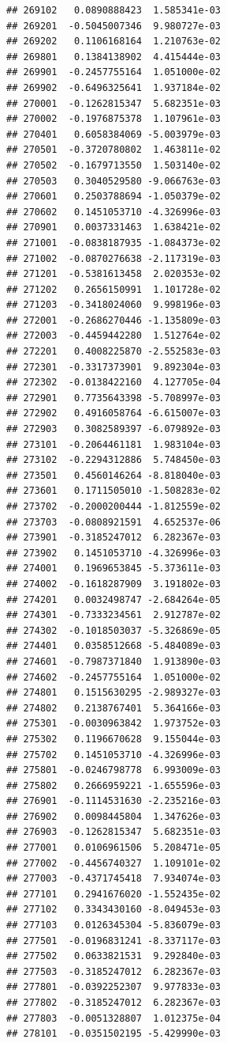 \documentclass[ignorenonframetext,]{beamer}
\begin{document}
\begin{frame}[fragile]
\begin{verbatim}
## 269102   0.0890888423  1.585341e-03
## 269201  -0.5045007346  9.980727e-03
## 269202   0.1106168164  1.210763e-02
## 269801   0.1384138902  4.415444e-03
## 269901  -0.2457755164  1.051000e-02
## 269902  -0.6496325641  1.937184e-02
## 270001  -0.1262815347  5.682351e-03
## 270002  -0.1976875378  1.107961e-03
## 270401   0.6058384069 -5.003979e-03
## 270501  -0.3720780802  1.463811e-02
## 270502  -0.1679713550  1.503140e-02
## 270503   0.3040529580 -9.066763e-03
## 270601   0.2503788694 -1.050379e-02
## 270602   0.1451053710 -4.326996e-03
## 270901   0.0037331463  1.638421e-02
## 271001  -0.0838187935 -1.084373e-02
## 271002  -0.0870276638 -2.117319e-03
## 271201  -0.5381613458  2.020353e-02
## 271202   0.2656150991  1.101728e-02
## 271203  -0.3418024060  9.998196e-03
## 272001  -0.2686270446 -1.135809e-03
## 272003  -0.4459442280  1.512764e-02
## 272201   0.4008225870 -2.552583e-03
## 272301  -0.3317373901  9.892304e-03
## 272302  -0.0138422160  4.127705e-04
## 272901   0.7735643398 -5.708997e-03
## 272902   0.4916058764 -6.615007e-03
## 272903   0.3082589397 -6.079892e-03
## 273101  -0.2064461181  1.983104e-03
## 273102  -0.2294312886  5.748450e-03
## 273501   0.4560146264 -8.818040e-03
## 273601   0.1711505010 -1.508283e-02
## 273702  -0.2000200444 -1.812559e-02
## 273703  -0.0808921591  4.652537e-06
## 273901  -0.3185247012  6.282367e-03
## 273902   0.1451053710 -4.326996e-03
## 274001   0.1969653845 -5.373611e-03
## 274002  -0.1618287909  3.191802e-03
## 274201   0.0032498747 -2.684264e-05
## 274301  -0.7333234561  2.912787e-02
## 274302  -0.1018503037 -5.326869e-05
## 274401   0.0358512668 -5.484089e-03
## 274601  -0.7987371840  1.913890e-03
## 274602  -0.2457755164  1.051000e-02
## 274801   0.1515630295 -2.989327e-03
## 274802   0.2138767401  5.364166e-03
## 275301  -0.0030963842  1.973752e-03
## 275302   0.1196670628  9.155044e-03
## 275702   0.1451053710 -4.326996e-03
## 275801  -0.0246798778  6.993009e-03
## 275802   0.2666959221 -1.655596e-03
## 276901  -0.1114531630 -2.235216e-03
## 276902   0.0098445804  1.347626e-03
## 276903  -0.1262815347  5.682351e-03
## 277001   0.0106961506  5.208471e-05
## 277002  -0.4456740327  1.109101e-02
## 277003  -0.4371745418  7.934074e-03
## 277101   0.2941676020 -1.552435e-02
## 277102   0.3343430160 -8.049453e-03
## 277103   0.0126345304 -5.836079e-03
## 277501  -0.0196831241 -8.337117e-03
## 277502   0.0633821531  9.292840e-03
## 277503  -0.3185247012  6.282367e-03
## 277801  -0.0392252307  9.977833e-03
## 277802  -0.3185247012  6.282367e-03
## 277803  -0.0051328807  1.012375e-04
## 278101  -0.0351502195 -5.429990e-03

\end{verbatim}
\end{frame}
\end{document}
